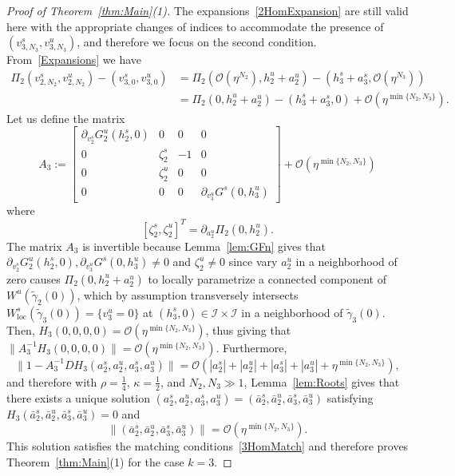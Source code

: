\documentclass[11pt]{article}
\numberwithin{equation}{section}
\theoremstyle{plain}
\begin{document}
\begin{proof}[Proof of Theorem~\ref{thm:Main}(1)]
The expansions~\eqref{2HomExpansion} are still valid here with the appropriate changes of indices to accommodate the presence of $(v^s_{3,N_3},v^u_{3,N_3})$, and therefore we focus on the second condition. From~\eqref{Expansions} we have
	\begin{equation}
		\begin{split}
		\Pi_2(v^s_{2,N_2},v^u_{2,N_2}) - (v^s_{3,0},v^u_{3,0}) &= \Pi_2(\mathcal{O}(\eta^{N_2}),h^u_2 + a^u_2) - (h^s_3 + a^s_3,\mathcal{O}(\eta^{N_3})) \\
		&= \Pi_2(0,h^u_2 + a^u_2 ) - (h^s_3 + a^s_3,0) + \mathcal{O}(\eta^{\min\{N_2,N_3\}}).
		\end{split}
	\end{equation} 
Let us define the matrix 
\begin{equation}\label{A3}
	A_3 := \begin{bmatrix}
			\partial_{v^s_2}G^u_2(h^s_2,0) & 0 & 0 & 0 \\ 0 & \zeta^s_2 & -1 & 0 \\ 0 & \zeta^u_2 & 0 & 0 \\ 0 & 0 & 0 & \partial_{v^u_3}G^s(0,h^u_3)
		\end{bmatrix} + \mathcal{O}(\eta^{\min\{N_2,N_3\}})
\end{equation}
where
\begin{equation}\label{xiEqn}
		[\zeta^s_2, \zeta^u_2]^T = \partial_{a^u_2}\Pi_2(0,h^u_2).
\end{equation}
The matrix $A_3$ is invertible because Lemma~\ref{lem:GFn} gives that $\partial_{v^s_2}G^u_2(h^s_2,0),\partial_{v^u_3}G^s(0,h^u_3) \neq 0$ and $\zeta^u_2 \neq 0$ since vary $a^u_2$ in a neighborhood of zero causes $\Pi_2(0,h^u_2+a^u_2)$ to locally parametrize a connected component of $W^u(\tilde\gamma_2(0))$, which by assumption transversely intersects $W^s_\mathrm{loc}(\tilde\gamma_3(0)) = \{v^u_3 = 0\}$ at $(h^s_3,0) \in \mathcal{I}\times\mathcal{I}$ in a neighborhood of $\tilde\gamma_3(0)$. Then, $H_3(0,0,0,0) = \mathcal{O}(\eta^{\min\{N_2,N_3\}})$, thus giving that $\|A_3^{-1}H_3(0,0,0,0)\| = \mathcal{O}(\eta^{\min\{N_2,N_3\}})$. Furthermore, 
\begin{equation}
	\|1 - A_3^{-1}DH_3(a^s_2,a^u_2,a^s_3,a^u_3)\| = \mathcal{O}(|a^s_2| + |a^u_2| + |a^s_3| + |a^u_3| + \eta^{\min\{N_2,N_3\}}),
\end{equation}  
and therefore with $\rho = \frac{1}{4}$, $\kappa = \frac{1}{2}$, and $N_2,N_3 \gg 1$, Lemma~\ref{lem:Roots} gives that there exists a unique solution $(a^s_2,a^u_2,a^s_3,a^u_3) = (\bar a^s_2,\bar  a^u_2,\bar  a^s_3,\bar a^u_3)$ satisfying $H_3(\bar a^s_2,\bar  a^u_2,\bar  a^s_3,\bar a^u_3) = 0$ and 
\begin{equation}
	\|(\bar a^s_2,\bar  a^u_2,\bar  a^s_3,\bar a^u_3)\| = \mathcal{O}(\eta^{\min\{N_2,N_3\}}). 
\end{equation}
This solution satisfies the matching conditions~\eqref{3HomMatch} and therefore proves Theorem~\ref{thm:Main}(1) for the case $k = 3$.


\end{proof}
\end{document}

